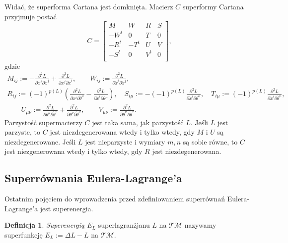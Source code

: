 \documentclass[11pt,a4paper]{report}
\theoremstyle{definition}
\newtheorem{definition}[theorem]{Definicja}
\begin{document}
Widać, że superforma Cartana jest domknięta. Macierz $C$ superformy Cartana przyjmuje postać
\begin{equation*}
C = \left[\begin{array}{cccc}
M&W&R&S\\
-W^t&0&T&0\\
-R^t&-T^t&U&V\\
-S^t&0&V^t&0\\
\end{array}\right]\!,
\end{equation*}
gdzie 
\begin{equation*}
\begin{gathered}
 M_{ij} :=  - \frac{\partial^2 L}{\partial x^i \partial \dot x^j} + \frac{\partial^2 L}{\partial x^j \partial \dot x^i}, 
 \qquad W_{ij} := \frac{\partial^2 L}{\partial \dot x^i \partial \dot x^j},\\
R_{ij} := (-1)^{p(L)} \left( \frac{\partial^2 L}{\partial x^i \partial \dot \theta^\mu} - \frac{\partial^2 L}{\partial \dot x^i \partial \theta^\mu} \right)\!,\quad 
 S_{i\mu} := -(-1)^{p(L)} \frac{\partial^2 L}{\partial \dot x^i \partial \dot \theta^\mu},
 \quad T_{i \mu} := (-1)^{p(L)} \frac{\partial^2 L}{\partial \dot x^i \partial \dot \theta^\mu},\\
 \qquad U_{\mu \nu} := \frac{\partial^2 L}{\partial \theta^\mu \partial \dot \theta^\nu}+\frac{\partial^2 L}{\partial \theta^\nu \partial \dot \theta^\mu},
 \qquad V_{\mu \nu} := \frac{\partial^2 L}{\partial \dot \theta^\mu \partial \dot \theta^\nu}.
\end{gathered}
\end{equation*}
Parzystość supermacierzy $C$ jest taka sama, jak parzystość $L$. Jeśli $L$ jest parzyste, to $C$ jest niezdegenerowana wtedy i tylko wtedy, gdy $M$ i $U$ są niezdegenerowane. Jeśli $L$ jest nieparzyste i wymiary $m,n$ są sobie równe, to $C$ jest niezgenerowana wtedy i tylko wtedy, gdy $R$ jest niezdegenerowana.

\subsection{Superrównania Eulera-Lagrange'a}

Ostatnim pojęciem do wprowadzenia przed zdefiniowaniem superrównań Eulera-Lagrange'a jest superenergia.

\begin{definition}
 \textit{Superenergią $E_L$} superlagranżjanu $L$ na $\mathcal{TM}$ nazywamy superfunkcję $E_L:=\Delta L-L$ na $\mathcal{TM}$.
 \end{definition}
\end{document}
